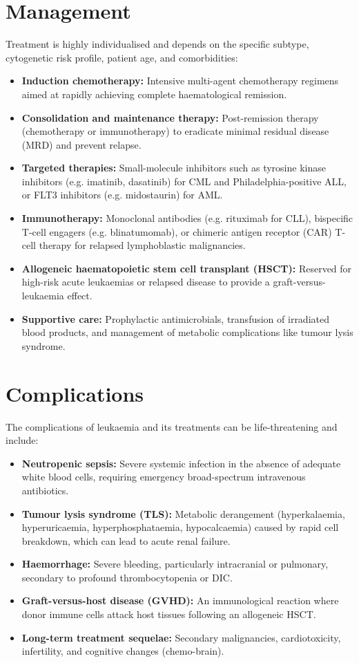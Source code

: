 \section*{Management}
Treatment is highly individualised and depends on the specific subtype, cytogenetic risk profile, patient age, and comorbidities:
\begin{itemize}
    \item \textbf{Induction chemotherapy:} Intensive multi-agent chemotherapy regimens aimed at rapidly achieving complete haematological remission.
    \item \textbf{Consolidation and maintenance therapy:} Post-remission therapy (chemotherapy or immunotherapy) to eradicate minimal residual disease (MRD) and prevent relapse.
    \item \textbf{Targeted therapies:} Small-molecule inhibitors such as tyrosine kinase inhibitors (e.g. imatinib, dasatinib) for CML and Philadelphia-positive ALL, or FLT3 inhibitors (e.g. midostaurin) for AML.
    \item \textbf{Immunotherapy:} Monoclonal antibodies (e.g. rituximab for CLL), bispecific T-cell engagers (e.g. blinatumomab), or chimeric antigen receptor (CAR) T-cell therapy for relapsed lymphoblastic malignancies.
    \item \textbf{Allogeneic haematopoietic stem cell transplant (HSCT):} Reserved for high-risk acute leukaemias or relapsed disease to provide a graft-versus-leukaemia effect.
    \item \textbf{Supportive care:} Prophylactic antimicrobials, transfusion of irradiated blood products, and management of metabolic complications like tumour lysis syndrome.
\end{itemize}

\section*{Complications}
The complications of leukaemia and its treatments can be life-threatening and include:
\begin{itemize}
    \item \textbf{Neutropenic sepsis:} Severe systemic infection in the absence of adequate white blood cells, requiring emergency broad-spectrum intravenous antibiotics.
    \item \textbf{Tumour lysis syndrome (TLS):} Metabolic derangement (hyperkalaemia, hyperuricaemia, hyperphosphataemia, hypocalcaemia) caused by rapid cell breakdown, which can lead to acute renal failure.
    \item \textbf{Haemorrhage:} Severe bleeding, particularly intracranial or pulmonary, secondary to profound thrombocytopenia or DIC.
    \item \textbf{Graft-versus-host disease (GVHD):} An immunological reaction where donor immune cells attack host tissues following an allogeneic HSCT.
    \item \textbf{Long-term treatment sequelae:} Secondary malignancies, cardiotoxicity, infertility, and cognitive changes (chemo-brain).
\end{itemize}

